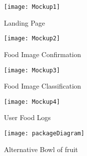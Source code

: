 \begin{figure}[ht] 
  \label{ fig7} 
  \begin{minipage}[b]{0.5\linewidth}
    \centering
    \texttt{[image: Mockup1]} 
    \caption{Landing Page} 
    \vspace{4ex}
  \end{minipage}%
  \begin{minipage}[b]{0.5\linewidth}
    \centering
    \texttt{[image: Mockup2]} 
    \caption{Food Image Confirmation} 
    \vspace{4ex}
  \end{minipage} 
  \begin{minipage}[b]{0.5\linewidth}
    \centering
    \texttt{[image: Mockup3]} 
    \caption{Food Image Classification} 
    \vspace{4ex}
  \end{minipage}%
  \begin{minipage}[b]{0.5\linewidth}
    \centering
    \texttt{[image: Mockup4]} 
    \caption{User Food Logs} 
    \vspace{4ex}
  \end{minipage} 
\end{figure}

\begin{figure}
    \texttt{[image: packageDiagram]}
    \caption{Alternative Bowl of fruit}
    \label{fig:newFruit}
\end{figure}
